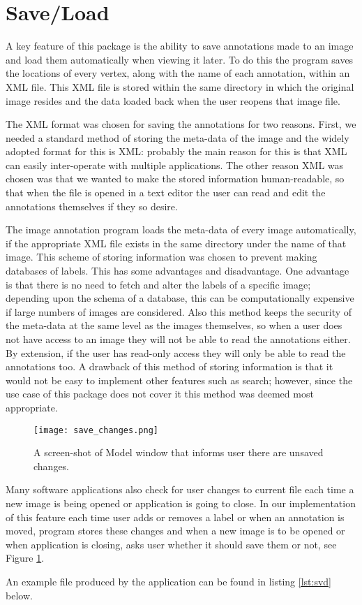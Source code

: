 \section{Save\slash Load}
A key feature of this package is the ability to save annotations made to an image and load them automatically when viewing it later. To do this the program saves the locations of every vertex, along with the name of each annotation, within an XML file.  This XML file is stored within the same directory in which the original image resides and the data loaded back when the user reopens that image file.

The XML format was chosen for saving the annotations for two reasons. First, we needed a standard method of storing the meta-data of the image and the widely adopted format for this is XML: probably the main reason for this is that XML can easily inter-operate with multiple applications.  The other reason XML was chosen was that we wanted to make the stored information human-readable, so that when the file is opened in a text editor the user can read and edit the annotations themselves if they so desire.

The image annotation program loads the meta-data of every image automatically, if the appropriate XML file exists in the same directory under the name of that image. This scheme of storing information was chosen to prevent making databases of labels. This has some advantages and disadvantage. One advantage is that there is no need to fetch and alter the labels of a specific image; depending upon the schema of a database, this can be computationally expensive if large numbers of images are considered. Also this method keeps the security of the meta-data at the same level as the images themselves, so when a user does not have access to an image they will not be able to read the annotations either.  By extension, if the user has read-only access they will only be able to read the annotations too. A drawback of this method of storing information is that it would not be easy to implement other features such as search; however, since the use case of this package does not cover it this method was deemed most appropriate.

\begin{figure}[h]
\centering
\texttt{[image: save\_changes.png]}
\caption{A screen-shot of Model window that informs user there are unsaved changes.}
\label{fig:saveview}
\end{figure}

Many software applications also check for user changes to current file each time a new image is being opened or application is going to close. In our implementation of this feature each time user adds or removes a label or when an annotation is moved, program stores these changes and when a new image is to be opened or when application is closing, asks user whether it should save them or not, see Figure \ref{fig:saveview}.

An example file produced by the application can be found in listing \ref{lst:svd} below.    

\begin{center}
\lstset{language=XML, basicstyle=\footnotesize\ttfamily, caption=XML file used to store image labels,frame=single,captionpos=b,label=lst:svd}

\end{center}

